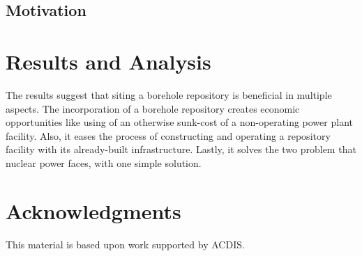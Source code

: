 \documentclass{anstrans}
\begin{document}
\subsection{Motivation}



\section{Results and Analysis}
The results suggest that siting a borehole repository is beneficial in multiple aspects. The incorporation of a borehole repository creates economic opportunities like using of an otherwise sunk-cost of a non-operating power plant facility. Also, it eases the process of constructing and operating a repository facility with its already-built infrastructure. Lastly, it solves the two problem that nuclear power faces, with one simple solution.

\section{Acknowledgments}

This material is based upon work supported by ACDIS.



\end{document}
